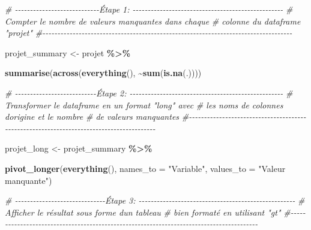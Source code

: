 \documentclass[
]{article}
\newenvironment{Shaded}{\begin{snugshade}}{\end{snugshade}}
\newcommand{\AttributeTok}[1]{\textcolor[rgb]{0.13,0.29,0.53}{#1}}
\newcommand{\CommentTok}[1]{\textcolor[rgb]{0.56,0.35,0.01}{\textit{#1}}}
\newcommand{\FunctionTok}[1]{\textcolor[rgb]{0.13,0.29,0.53}{\textbf{#1}}}
\newcommand{\NormalTok}[1]{#1}
\newcommand{\OtherTok}[1]{\textcolor[rgb]{0.56,0.35,0.01}{#1}}
\newcommand{\SpecialCharTok}[1]{\textcolor[rgb]{0.81,0.36,0.00}{\textbf{#1}}}
\newcommand{\StringTok}[1]{\textcolor[rgb]{0.31,0.60,0.02}{#1}}
\begin{document}
\begin{Shaded}
\begin{Highlighting}[]
\CommentTok{\# {-}{-}{-}{-}{-}{-}{-}{-}{-}{-}{-}{-}{-}{-}{-}{-}{-}{-}{-}{-}{-}{-}{-}{-}{-}{-}{-}{-}Étape 1: {-}{-}{-}{-}{-}{-}{-}{-}{-}{-}{-}{-}{-}{-}{-}{-}{-}{-}{-}{-}{-}{-}{-}{-}{-}{-}{-}{-}{-}{-}{-}{-}{-}{-}{-}{-}{-}{-}{-}{-}{-}{-}{-}{-}{-}{-}{-}{-}{-}{-}}
\CommentTok{\#   Compter le nombre de valeurs manquantes dans chaque       }
\CommentTok{\#          colonne du dataframe "projet"                      }
\CommentTok{\#{-}{-}{-}{-}{-}{-}{-}{-}{-}{-}{-}{-}{-}{-}{-}{-}{-}{-}{-}{-}{-}{-}{-}{-}{-}{-}{-}{-}{-}{-}{-}{-}{-}{-}{-}{-}{-}{-}{-}{-}{-}{-}{-}{-}{-}{-}{-}{-}{-}{-}{-}{-}{-}{-}{-}{-}{-}{-}{-}{-}{-}{-}{-}{-}{-}{-}{-}{-}{-}{-}{-}{-}{-}{-}{-}{-}{-}{-}{-}{-}{-}{-}{-}}

\NormalTok{projet\_summary }\OtherTok{\textless{}{-}}\NormalTok{ projet }\SpecialCharTok{\%\textgreater{}\%}
  
  \FunctionTok{summarise}\NormalTok{(}\FunctionTok{across}\NormalTok{(}\FunctionTok{everything}\NormalTok{(), }\SpecialCharTok{\textasciitilde{}}\FunctionTok{sum}\NormalTok{(}\FunctionTok{is.na}\NormalTok{(.))))}


\CommentTok{\# {-}{-}{-}{-}{-}{-}{-}{-}{-}{-}{-}{-}{-}{-}{-}{-}{-}{-}{-}{-}{-}{-}{-}{-}{-}{-}{-}Étape 2: {-}{-}{-}{-}{-}{-}{-}{-}{-}{-}{-}{-}{-}{-}{-}{-}{-}{-}{-}{-}{-}{-}{-}{-}{-}{-}{-}{-}{-}{-}{-}{-}{-}{-}{-}{-}{-}{-}{-}{-}{-}{-}{-}{-}{-}{-}{-}{-}{-}{-}{-}}
\CommentTok{\#   Transformer le dataframe en un format "long" avec         }
\CommentTok{\#     les noms de colonnes d\textquotesingle{}origine et le nombre             }
\CommentTok{\#           de valeurs manquantes                             }
\CommentTok{\#{-}{-}{-}{-}{-}{-}{-}{-}{-}{-}{-}{-}{-}{-}{-}{-}{-}{-}{-}{-}{-}{-}{-}{-}{-}{-}{-}{-}{-}{-}{-}{-}{-}{-}{-}{-}{-}{-}{-}{-}{-}{-}{-}{-}{-}{-}{-}{-}{-}{-}{-}{-}{-}{-}{-}{-}{-}{-}{-}{-}{-}{-}{-}{-}{-}{-}{-}{-}{-}{-}{-}{-}{-}{-}{-}{-}{-}{-}{-}{-}{-}{-}{-}{-}{-}{-}{-}{-}{-}}

\NormalTok{projet\_long }\OtherTok{\textless{}{-}}\NormalTok{ projet\_summary }\SpecialCharTok{\%\textgreater{}\%}
  
  \FunctionTok{pivot\_longer}\NormalTok{(}\FunctionTok{everything}\NormalTok{(), }\AttributeTok{names\_to =} \StringTok{"Variable"}\NormalTok{, }\AttributeTok{values\_to =} \StringTok{"Valeur manquante"}\NormalTok{)}


\CommentTok{\# {-}{-}{-}{-}{-}{-}{-}{-}{-}{-}{-}{-}{-}{-}{-}{-}{-}{-}{-}{-}{-}{-}{-}{-}{-}{-}{-}{-}{-}{-}Étape 3: {-}{-}{-}{-}{-}{-}{-}{-}{-}{-}{-}{-}{-}{-}{-}{-}{-}{-}{-}{-}{-}{-}{-}{-}{-}{-}{-}{-}{-}{-}{-}{-}{-}{-}{-}{-}{-}{-}{-}{-}{-}{-}{-}{-}{-}{-}{-}{-}{-}{-}{-}{-}}
\CommentTok{\#     Afficher le résultat sous forme d\textquotesingle{}un tableau            }
\CommentTok{\#       bien formaté en utilisant  "gt"                       }
\CommentTok{\#{-}{-}{-}{-}{-}{-}{-}{-}{-}{-}{-}{-}{-}{-}{-}{-}{-}{-}{-}{-}{-}{-}{-}{-}{-}{-}{-}{-}{-}{-}{-}{-}{-}{-}{-}{-}{-}{-}{-}{-}{-}{-}{-}{-}{-}{-}{-}{-}{-}{-}{-}{-}{-}{-}{-}{-}{-}{-}{-}{-}{-}{-}{-}{-}{-}{-}{-}{-}{-}{-}{-}{-}{-}{-}{-}{-}{-}{-}{-}{-}{-}{-}{-}{-}{-}{-}{-}{-}{-}}


\end{Highlighting}
\end{Shaded}
\end{document}
